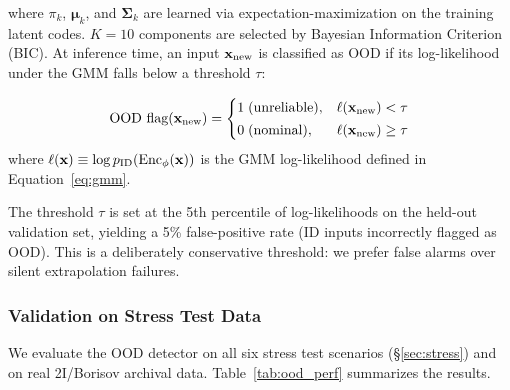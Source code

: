\documentclass[usenatbib]{mnras}
\begin{document}
where $\pi_k$, $\boldsymbol{\mu}_k$, and $\boldsymbol{\Sigma}_k$ are learned via expectation-maximization on the training latent codes. $K=10$ components are selected by Bayesian Information Criterion (BIC). At inference time, an input $\mathbf{x}_{\rm new}$ is classified as OOD if its log-likelihood under the GMM falls below a threshold $\tau$:

\begin{equation}\label{eq:ood_flag}
\text{OOD flag}(\mathbf{x}_{\rm new}) =
\begin{cases}
1 \; \text{(unreliable)}, & \ell(\mathbf{x}_{\rm new}) < \tau \\[2pt]
0 \; \text{(nominal)},   & \ell(\mathbf{x}_{\rm new}) \geq \tau
\end{cases}
\end{equation}
where $\ell(\mathbf{x}) \equiv \log p_{\rm ID}(\text{Enc}_\phi(\mathbf{x}))$ is the GMM log-likelihood defined in Equation~\ref{eq:gmm}.

The threshold $\tau$ is set at the 5th percentile of log-likelihoods on the held-out validation set, yielding a 5\% false-positive rate (ID inputs incorrectly flagged as OOD). This is a deliberately conservative threshold: we prefer false alarms over silent extrapolation failures.

\subsubsection{Validation on Stress Test Data}

We evaluate the OOD detector on all six stress test scenarios (\S\ref{sec:stress}) and on real 2I/Borisov archival data. Table~\ref{tab:ood_perf} summarizes the results.
\end{document}
